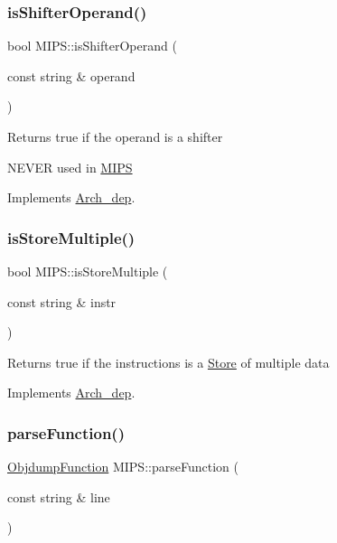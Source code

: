 \subsubsection{\texorpdfstring{is\+Shifter\+Operand()}{isShifterOperand()}}
{\footnotesize\ttfamily bool M\+I\+P\+S\+::is\+Shifter\+Operand (\begin{DoxyParamCaption}\item[{const string \&}]{operand }\end{DoxyParamCaption})\hspace{0.3cm}{\ttfamily [virtual]}}

Returns true if the operand is a shifter

N\+E\+V\+ER used in \hyperlink{classMIPS}{M\+I\+PS} 

Implements \hyperlink{classArch__dep_ad56e95263903d54aabbb91efdcf7eba4}{Arch\+\_\+dep}.

\mbox{\label{classMIPS_a781bec4f737ea512ada3f3fa166463c9}} 
\subsubsection{\texorpdfstring{is\+Store\+Multiple()}{isStoreMultiple()}}
{\footnotesize\ttfamily bool M\+I\+P\+S\+::is\+Store\+Multiple (\begin{DoxyParamCaption}\item[{const string \&}]{instr }\end{DoxyParamCaption})\hspace{0.3cm}{\ttfamily [virtual]}}

Returns true if the instructions is a \hyperlink{classStore}{Store} of multiple data 

Implements \hyperlink{classArch__dep_a54438a476a16d55659124aea0c38397a}{Arch\+\_\+dep}.

\mbox{\label{classMIPS_a03874bd0a2a980e174ea447482a830c3}} 
\subsubsection{\texorpdfstring{parse\+Function()}{parseFunction()}}
{\footnotesize\ttfamily \hyperlink{classObjdumpFunction}{Objdump\+Function} M\+I\+P\+S\+::parse\+Function (\begin{DoxyParamCaption}\item[{const string \&}]{line }\end{DoxyParamCaption})\hspace{0.3cm}{\ttfamily [virtual]}}


